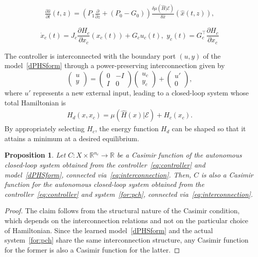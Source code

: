 \documentclass[10pt,a4paper]{amsart}
\newtheorem{prop}{Proposition}
\begin{document}
\begin{align}\label{dPHSform}
\frac{\partial \hat{x}}{\partial t}(t,z) = \left(P_1 \frac{\partial}{\partial z}  + (P_0 - G_0)\right)\frac{\delta \mu(\hat{H}|\mathcal{E})}{\delta \hat{x}}(\hat{x}(t,z)),
\end{align}

\begin{equation}
\dot{x}_c(t) = J_c \frac{\partial H_c}{\partial x_c}(x_c(t)) + G_c u_c(t), \,\,
y_c(t) = G_c^\top \frac{\partial H_c}{\partial x_c}
\label{eq:controller}
\end{equation}

The controller is interconnected with the boundary port $(u,y)$ of the model~\cref{dPHSform} through a power-preserving interconnection given by
\begin{equation}
\begin{pmatrix}
u \\
y
\end{pmatrix}
=
\begin{pmatrix}
0 & -I \\
I & 0
\end{pmatrix}
\begin{pmatrix}
u_c \\
y_c
\end{pmatrix}
+
\begin{pmatrix}
u' \\
0
\end{pmatrix},
\label{eq:interconnection}
\end{equation}
where $u'$ represents a new external input, leading to a closed-loop system whose total Hamiltonian is
\begin{align}
H_d(x,x_c) = \mu(\hat{H}(x)|\mathcal{E}) + H_c(x_c).
\end{align}
By appropriately selecting $H_c$, the energy function $H_d$ can be shaped so that it attains a minimum at a desired equilibrium.

\begin{prop}\label{prop:1}
Let $C \colon X \times \mathbb{R}^{n_c} \to \mathbb{R}$ be a Casimir function of the autonomous closed-loop system obtained from the controller~\cref{eq:controller} and \textit{model}~\cref{dPHSform}, connected via~\eqref{eq:interconnection}. Then, $C$ is also a Casimir function for the autonomous closed-loop system obtained from the controller~\cref{eq:controller} and \textit{system}~\cref{for:pch}, connected via~\eqref{eq:interconnection}.
\end{prop}

\begin{proof}
The claim follows from the structural nature of the Casimir condition, which depends on the interconnection relations and not on the particular choice of Hamiltonian. Since the learned model~\cref{dPHSform} and the actual system~\cref{for:pch} share the same interconnection structure, any Casimir function for the former is also a Casimir function for the latter.
\end{proof}
\end{document}
